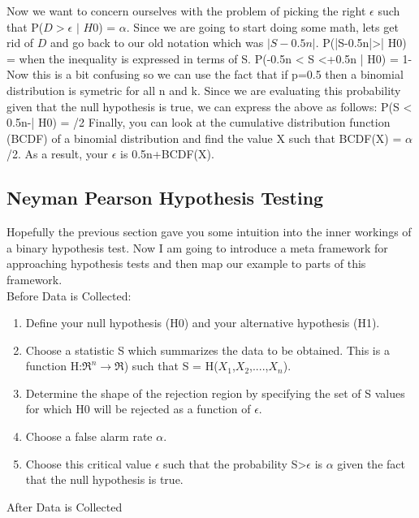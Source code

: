 Now we want to concern ourselves with the problem of picking the right $\epsilon$ such that P(\(D\)$>$$\epsilon$ $|$ \(H0\)) = $\alpha$.
Since we are going to start doing some math, lets get rid of \(D\) and go back to our old notation which was \(|S-0.5n|\).
\beq
\label{eq:confidence_intervals}
P(|S-0.5n|>\epsilon | H0) = \alpha
\eeq
when the inequality is expressed in terms of S. 
\beq
\label{eq:confidence_intervals2}
P(\epsilon-0.5n < S <\epsilon+0.5n | H0) = 1-\alpha
\eeq
Now this is a bit confusing so we can use the fact that if p=0.5 then a binomial distribution is symetric for all n and k. 
Since we are evaluating this probability given that the null hypothesis is true, we can express the above as follows:
\beq
\label{eq:confidence_intervals3}
P(S < 0.5n-\epsilon | H0) = \alpha/2
\eeq
Finally, you can look at the cumulative distribution function (BCDF) of a binomial distribution and find 
the value X such that BCDF(X) = $\alpha$/2. As a result, your $\epsilon$ is 0.5n+BCDF(X).

\subsection{Neyman Pearson Hypothesis Testing}

Hopefully the previous section gave you some intuition into the inner workings of a binary 
hypothesis test. Now I am going to introduce a meta framework for approaching hypothesis 
tests and then map our example to parts of this framework.\\

Before Data is Collected:

\begin{enumerate}
\item Define your null hypothesis (H0) and your alternative hypothesis (H1).
\item Choose a statistic S which summarizes the data to be obtained. This is a function H:$\Re^n$$\rightarrow$$\Re$) such that S = H($X_1$,$X_2$,....,$X_n$).
\item Determine the shape of the rejection region by specifying the set of S values for which H0 will be rejected as a function of $\epsilon$.
\item Choose a false alarm rate $\alpha$.
\item Choose this critical value $\epsilon$ such that the probability S>$\epsilon$ is $\alpha$ given the fact that the null hypothesis is true.
\end{enumerate}

After Data is Collected


